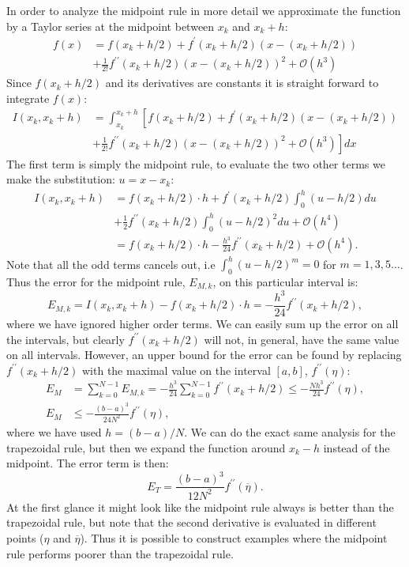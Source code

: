 \documentclass[graybox,sectrefs,envcountresetchap,open=right,final]{svmonodo}
\begin{document}
In order to analyze the midpoint rule in more detail we approximate the function by a Taylor 
series at the midpoint between $x_k$ and $x_k+h$: 
\begin{align}
f(x)&=f(x_k+h/2)+f^\prime(x_k+h/2)(x-(x_k+h/2))\nonumber\\ 
&+\frac{1}{2!}f^{\prime\prime}(x_k+h/2)(x-(x_k+h/2))^2+\mathcal{O}(h^3)
\end{align}
Since $f(x_k+h/2)$ and its derivatives are constants it is straight forward to integrate $f(x)$:
\begin{align}
I(x_k,x_k+h)&=\int_{x_k}^{x_k+h}\left[f(x_k+h/2)+f^\prime(x_k+h/2)(x-(x_k+h/2))\right.\nonumber\\ 
&\left.+\frac{1}{2!}f^{\prime\prime}(x_k+h/2)(x-(x_k+h/2))^2+\mathcal{O}(h^3)\right]dx
\end{align}
The first term is simply the midpoint rule, to evaluate the two other terms we make the substitution: $u=x-x_k$:
\begin{align}
I(x_k,x_k+h)&=f(x_k+h/2)\cdot h+f^\prime(x_k+h/2)\int_0^h(u-h/2)du\nonumber\\ 
&+\frac{1}{2}f^{\prime\prime}(x_k+h/2)\int_0^h(u-h/2)^2du+\mathcal{O}(h^4)\nonumber\\ 
&=f(x_k+h/2)\cdot h-\frac{h^3}{24}f^{\prime\prime}(x_k+h/2)+\mathcal{O}(h^4).
\end{align}
Note that all the odd terms cancels out, i.e $\int_0^h(u-h/2)^m=0$ for $m=1,3,5\ldots$. Thus the error for the midpoint rule, $E_{M,k}$, on this particular interval is:
\begin{equation}
E_{M,k}=I(x_k,x_k+h)-f(x_k+h/2)\cdot h=-\frac{h^3}{24}f^{\prime\prime}(x_k+h/2),
\end{equation}
where we have ignored higher order terms. We can easily sum up the error on all the intervals, but clearly $f^{\prime\prime}(x_k+h/2)$ will 
not, in general, have the same value on all intervals. However, an upper bound for the error can be found by replacing $f^{\prime\prime}(x_k+h/2)$ 
with the maximal value on the interval $[a,b]$, $f^{\prime\prime}(\eta)$:
\begin{align}
E_{M}&=\sum_{k=0}^{N-1}E_{M,k}=-\frac{h^3}{24}\sum_{k=0}^{N-1}f^{\prime\prime}(x_k+h/2)\leq-\frac{Nh^3}{24}f^{\prime\prime}(\eta),\label{eq:numint:em}\\ 
E_{M}&\leq-\frac{(b-a)^3}{24N^2}f^{\prime\prime}(\eta),
\end{align}
where we have used $h=(b-a)/N$. We can do the exact same analysis for the trapezoidal rule, but then we expand the function around $x_k-h$ instead of the midpoint. 
The error term is then:
\begin{equation}
E_T=\frac{(b-a)^3}{12N^2}f^{\prime\prime}(\overline{\eta}).
\end{equation}
At the first glance it might look like the midpoint rule always is better than the trapezoidal rule, but note that the second derivative is 
evaluated in different points ($\eta$ and $\overline{\eta}$). Thus it is possible to construct examples where the midpoint rule performs poorer 
than the trapezoidal rule.
\end{document}
